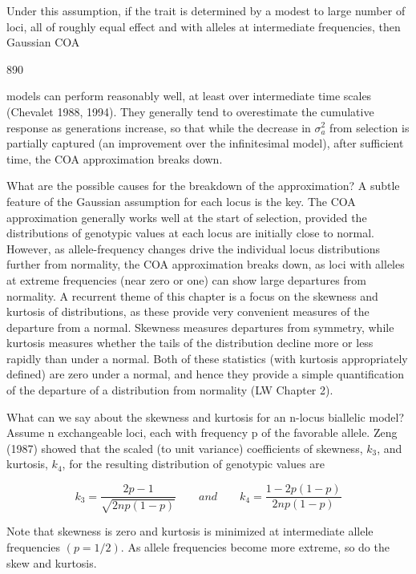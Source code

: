 \documentclass{article}
\begin{document}
Under this assumption, if the trait is determined by a modest to large number of loci, all of roughly equal effect and with alleles at intermediate frequencies, then Gaussian COA

890

models can perform reasonably well, at least over intermediate time scales (Chevalet 1988, 1994). They generally tend to overestimate the cumulative response as generations increase, so that while the decrease in  $ \sigma_{a}^{2} $ from selection is partially captured (an improvement over the infinitesimal model), after sufficient time, the COA approximation breaks down.

What are the possible causes for the breakdown of the approximation? A subtle feature of the Gaussian assumption for each locus is the key. The COA approximation generally works well at the start of selection, provided the distributions of genotypic values at each locus are initially close to normal. However, as allele-frequency changes drive the individual locus distributions further from normality, the COA approximation breaks down, as loci with alleles at extreme frequencies (near zero or one) can show large departures from normality. A recurrent theme of this chapter is a focus on the skewness and kurtosis of distributions, as these provide very convenient measures of the departure from a normal. Skewness measures departures from symmetry, while kurtosis measures whether the tails of the distribution decline more or less rapidly than under a normal. Both of these statistics (with kurtosis appropriately defined) are zero under a normal, and hence they provide a simple quantification of the departure of a distribution from normality (LW Chapter 2).

What can we say about the skewness and kurtosis for an n-locus biallelic model? Assume n exchangeable loci, each with frequency p of the favorable allele. Zeng (1987) showed that the scaled (to unit variance) coefficients of skewness,  $ k_{3} $, and kurtosis,  $ k_{4} $, for the resulting distribution of genotypic values are

\begin{equation}
k_{3}=\frac{2p-1}{\sqrt{2np(1-p)}}\qquad and\qquad k_{4}=\frac{1-2p(1-p)}{2np(1-p)}
\tag{24.6}
\label{eq:24_6}
\end{equation}

Note that skewness is zero and kurtosis is minimized at intermediate allele frequencies  $ (p = 1/2) $. As allele frequencies become more extreme, so do the skew and kurtosis.
\end{document}
